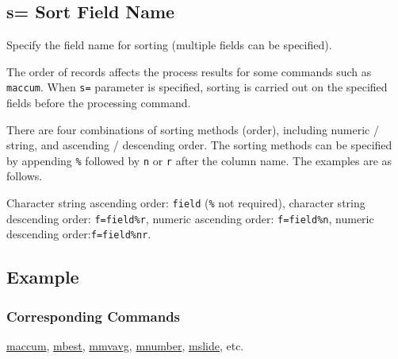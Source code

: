 
%

\subsection{s= Sort Field Name\label{sect:option_s}}

Specify the field name for sorting (multiple fields can be specified). 

The order of records affects the process results for some commands such as \verb|maccum|. 
When \verb|s=| parameter is specified, sorting is carried out on the specified fields before the processing command. 

There are four combinations of sorting methods (order), including numeric / string, and ascending / descending order. 
The sorting methods can be specified by appending \verb|%| followed by \verb|n| or \verb|r| after the column name. The examples are as follows. 

Character string ascending order: \verb|field|  (\verb|%| not required), character string descending order: \verb|f=field%r|, numeric ascending order: \verb|f=field%n|, numeric descending order:\verb|f=field%nr|.


\subsection*{Example}


\subsubsection*{Corresponding Commands}
\hyperref[sect:maccum]{maccum},
\hyperref[sect:mbest]{mbest},
\hyperref[sect:mmvavg]{mmvavg},
\hyperref[sect:mnumber]{mnumber},
\hyperref[sect:mslide]{mslide}, etc. 

%

